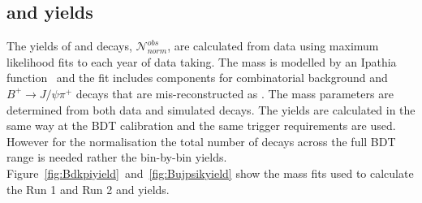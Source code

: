 {{%



\subsection{\bdkpi and \bujpsik yields}
The yields of \bujpsik and \bdkpi decays, $ \mathcal{N}^{obs}_{norm}$, are calculated from data using maximum likelihood fits to each year of data taking. 
The \bujpsik mass \pdf is modelled by an Ipathia function~\cite{} and the fit includes components for combinatorial background and $B^{+} \to J/\psi \pi^{+}$ decays that are mis-reconstructed as \bujpsik. The mass \pdf parameters are determined from both data and simulated decays. The \bdkpi yields are calculated in the same way at the BDT calibration and the same trigger requirements are used. However for the normalisation the total number of \bdkpi decays across the full BDT range is needed rather the bin-by-bin yields. Figure~\ref{fig:Bdkpiyield}~and~\ref{fig:Bujpsikyield} show the mass fits used to calculate the Run 1 and Run 2 \bdkpi and \bujpsik yields.


}}
